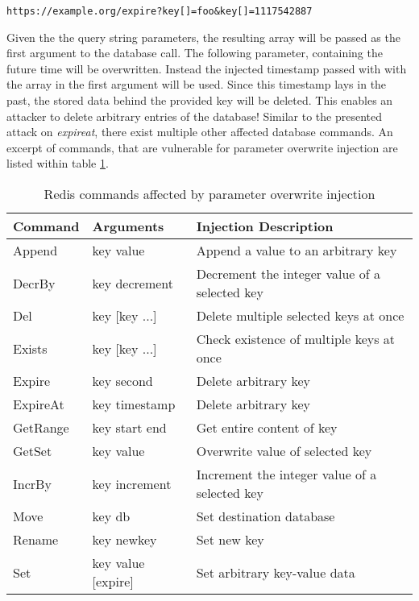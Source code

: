 \begin{lstlisting}[caption={Attack vector on Redis for query selector injection via HTTP GET}, label={lst:parameterOverwriteAtt}]
https://example.org/expire?key[]=foo&key[]=1117542887
\end{lstlisting}

Given the the query string parameters, the resulting array will be passed as the first argument to the database call. The following parameter, containing the future time will be overwritten. Instead the injected timestamp passed with with the array in the first argument will be used. Since this timestamp lays in the past, the stored data behind the provided key will be deleted. This enables an attacker to delete arbitrary entries of the database! Similar to the presented attack on \emph{expireat}, there exist multiple other affected database commands. An excerpt of commands, that are vulnerable for parameter overwrite injection are listed within table \ref{tab:redis_commands_affected}. \\

\begin{table}[h]
 \sffamily
 \centering
 \begin{tabular}{lll}
  \textbf{Command} & \textbf{Arguments} & \textbf{Injection Description} \\ \hline
  Append  & key value       & Append a value to an arbitrary key\\
  DecrBy  & key decrement   & Decrement the integer value of a selected key \\
  Del     & key [key ...]   & Delete multiple selected keys at once \\
  Exists  & key [key ...]   & Check existence of multiple keys at once \\
  Expire  & key second      & Delete arbitrary key \\
  ExpireAt& key timestamp & Delete arbitrary key \\
  GetRange& key start end & Get entire content of key \\
  GetSet  & key value & Overwrite value of selected key \\
  IncrBy  & key increment & Increment the integer value of a selected key \\
  Move    & key db & Set destination database \\
  Rename  & key newkey & Set new key \\
  Set     & key value [expire] & Set arbitrary key-value data \\
  \bottomrule 
 \end{tabular}
 \caption{Redis commands affected by parameter overwrite injection}
 \label{tab:redis_commands_affected}
\end{table}

